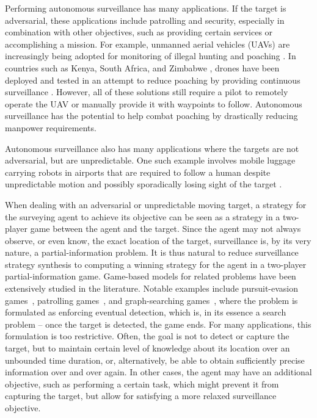 

Performing autonomous surveillance has many applications. If the target is adversarial, these applications include patrolling and security, especially in combination with other objectives, such as providing certain services or accomplishing a mission. For example, unmanned aerial vehicles (UAVs) are increasingly being adopted for monitoring of illegal hunting and poaching \cite{poaching}. In countries such as Kenya, South Africa, and Zimbabwe \cite{drones}, drones have been deployed and tested in an attempt to reduce poaching by providing continuous surveillance \cite{poaching}. However, all of these solutions still require a pilot to remotely operate the UAV or manually provide it with waypoints to follow. Autonomous surveillance has the potential to help combat poaching by drastically reducing manpower requirements. 

Autonomous surveillance also has many applications where the targets are not adversarial, but are unpredictable. One such example involves mobile luggage carrying robots in airports that are required to follow a human despite unpredictable motion and possibly sporadically losing sight of the target \cite{GonBanos02}. 

When dealing with an adversarial or unpredictable moving target, a strategy for the surveying agent to achieve its objective can be seen as a strategy in a two-player game between the agent and the target. Since the agent may not always observe, or even know, the exact location of the target, surveillance is, by its very nature, a partial-information problem.
It is thus natural to reduce surveillance strategy synthesis to computing a winning strategy for the agent in a two-player partial-information game. Game-based models for related problems have been extensively studied in the literature. Notable examples include pursuit-evasion games~\cite{Chung2011}, patrolling games~\cite{Basilico12}, and graph-searching games~\cite{Kreutzer11}, where the problem is formulated as enforcing eventual detection, which is, in its essence a search problem -- once the target is detected, the game ends. For many applications, this formulation is too restrictive. Often, the goal is not to detect or capture the target, but to maintain certain level of knowledge about its location over an unbounded time duration, or, alternatively, be able to obtain sufficiently precise information over and over again. In other cases, the agent may have an additional objective, such as performing a certain task, which might prevent it from capturing the target, but allow for satisfying a more relaxed surveillance objective.

